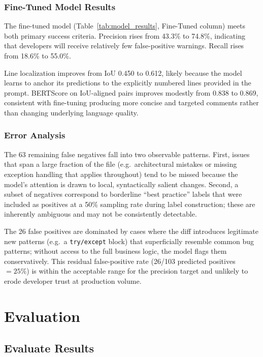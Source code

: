 \documentclass[11pt]{article}
\begin{document}
\subsubsection*{Fine-Tuned Model Results}

The fine-tuned model (Table~\ref{tab:model_results}, Fine-Tuned column) meets both primary success criteria. Precision rises from 43.3\% to 74.8\%, indicating that developers will receive relatively few false-positive warnings. Recall rises from 18.6\% to 55.0\%.

Line localization improves from IoU 0.450 to 0.612, likely because the model learns to anchor its predictions to the explicitly numbered lines provided in the prompt. BERTScore on IoU-aligned pairs improves modestly from 0.838 to 0.869, consistent with fine-tuning producing more concise and targeted comments rather than changing underlying language quality.

\subsubsection*{Error Analysis}

The 63 remaining false negatives fall into two observable patterns. First, issues that span a large fraction of the file (e.g.\ architectural mistakes or missing exception handling that applies throughout) tend to be missed because the model's attention is drawn to local, syntactically salient changes. Second, a subset of negatives correspond to borderline ``best practice'' labels that were included as positives at a 50\% sampling rate during label construction; these are inherently ambiguous and may not be consistently detectable.

The 26 false positives are dominated by cases where the diff introduces legitimate new patterns (e.g.\ a \texttt{try/except} block) that superficially resemble common bug patterns; without access to the full business logic, the model flags them conservatively. This residual false-positive rate (26/103 predicted positives $= 25\%$) is within the acceptable range for the precision target and unlikely to erode developer trust at production volume.

\section*{Evaluation}

\subsection*{Evaluate Results}
\end{document}
